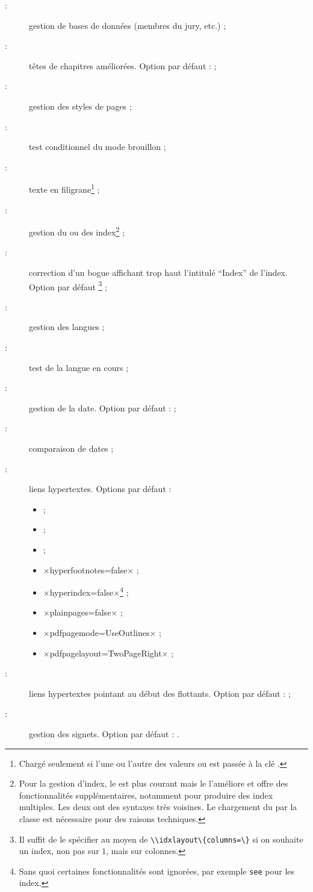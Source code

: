 \begin{description}
\item[ :] gestion de bases de données (membres du
  jury, etc.) ;
\item[ :] têtes de chapitres améliorées. Option par défaut :
   ;
\item[ :] gestion des styles de pages ;
\item[ :] test conditionnel du mode brouillon ;
\item[ :] texte en filigrane\footnote{Chargé seulement
    si l'une ou l'autre des valeurs  ou 
    est passée à la clé .} ;
\item[ :] gestion du ou des index\footnote{Pour la gestion
    d'index, le  est plus courant mais le 
    l'améliore et offre des fonctionnalités supplémentaires, notamment pour
    produire des index multiples. Les deux ont des syntaxes très voisines. Le
    chargement du  par la classe est nécessaire pour des raisons
    techniques.} ;
\item[ :] correction d'un bogue affichant trop haut
  l'intitulé \enquote{Index} de l'index. Option par défaut
  \footnote{Il suffit de le spécifier au moyen de
    \protect\lstinline+\\idxlayout\{columns=+\protect\lstinline+\}+ si
    on souhaite un index, non pas sur $1$, mais sur  colonnes.} ;
\item[ :] gestion des langues ;
\item[ :] test de la langue en cours ;
\item[ :] gestion de la date. Option par défaut :
   ;
\item[ :] comparaison de dates ;
\item[ :] liens hypertextes. Options par défaut :
  \begin{itemize}
  \item {} ;
  \item {} ;
  \item {} ;
  \item ×hyperfootnotes=false× ;
  \item ×hyperindex=false×\footnote{Sans quoi certaines fonctionnalités sont
      ignorées, par exemple \protect\lstinline|see| pour les index.} ;
  \item ×plainpages=false× ;
  \item ×pdfpagemode=UseOutlines× ;
  \item ×pdfpagelayout=TwoPageRight× ;
  \end{itemize}
\item[ :] liens hypertextes pointant au début des
  flottants\ifscreenoutput. Option par défaut :  ;
\item[ :] gestion des signets\ifscreenoutput. Option par
  défaut : .
\end{description}


